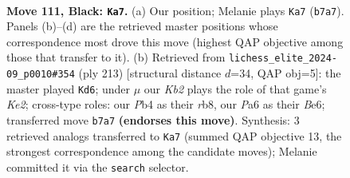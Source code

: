 \documentclass[11pt]{article}
\begin{document}
\begin{figure}[p]\centering
\begin{subfigure}{0.46\textwidth}\centering
\resizebox{\linewidth}{!}{%
\newchessgame
\chessboard[
  setfen={8/1k6/p5r1/P1p2p1p/1p3P1P/1P2PKP1/8/7R b - - 10 111},
  showmover=false,
  pgfstyle=straightmove, color=movearrow, markmove={b7-a7}
]}
\caption{}
\end{subfigure}\hfill
\begin{subfigure}{0.46\textwidth}\centering
\resizebox{\linewidth}{!}{%
\newchessgame
\chessboard[
  setfen={1R6/4k3/4b1p1/2p4p/p1r4P/P1B2PK1/1P4P1/8 b - - 35 107},
  showmover=false,
  pgfstyle=straightmove, color=movearrow, markmove={e7-d6}
]}
\caption{}
\end{subfigure}
\\[4pt]

\caption{\textbf{Move 111, Black: \texttt{Ka7}.} (a) Our position; Melanie plays \texttt{Ka7} (\texttt{b7a7}). Panels (b)--(d) are the retrieved master positions whose correspondence most drove this move (highest QAP objective among those that transfer to it). (b) Retrieved from \texttt{lichess\_elite\_2024-09\_p0010\#354} (ply 213) [structural distance $d$=34, QAP obj=5]: the master played \texttt{Kd6}; under $\mu$ our \emph{Kb2} plays the role of that game's \emph{Ke2}; cross-type roles: our \emph{P}b4 as their \emph{r}b8, our \emph{P}a6 as their \emph{B}e6; transferred move \texttt{b7a7} \textbf{(endorses this move)}. Synthesis: 3 retrieved analogs transferred to \texttt{Ka7} (summed QAP objective 13, the strongest correspondence among the candidate moves); Melanie committed it via the \texttt{search} selector.}
\label{fig:thought-m221}
\end{figure}

\clearpage
\end{document}
